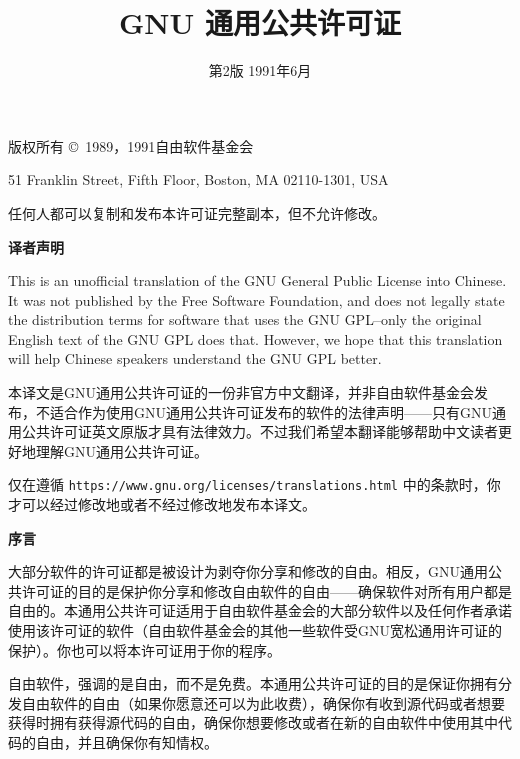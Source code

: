 \documentclass[11pt]{article}
\title{GNU 通用公共许可证}
\date{第2版 \space 1991年6月}
\begin{document}
\maketitle

\begin{center}
{\parindent 0in

版权所有 \copyright\ 1989，1991自由软件基金会

\bigskip

51 Franklin Street, Fifth Floor, Boston, MA  02110-1301, USA

\bigskip

任何人都可以复制和发布本许可证完整副本，但不允许修改。
}
\end{center}

\begin{center}
  {\bf\large 译者声明}
\end{center}

This is an unofficial translation of the GNU General Public License into Chinese. It was not published by the Free Software Foundation, and does not legally state the distribution terms for software that uses the GNU GPL--only the original English text of the GNU GPL does that. However, we hope that this translation will help Chinese speakers understand the GNU GPL better.

本译文是GNU通用公共许可证的一份非官方中文翻译，并非自由软件基金会发布，不适合作为使用GNU通用公共许可证发布的软件的法律声明——只有GNU通用公共许可证英文原版才具有法律效力。不过我们希望本翻译能够帮助中文读者更好地理解GNU通用公共许可证。

仅在遵循 \texttt{https://www.gnu.org/licenses/translations.html} 中的条款时，你才可以经过修改地或者不经过修改地发布本译文。

\pagebreak

\begin{center}
{\bf\large 序言}
\end{center}

大部分软件的许可证都是被设计为剥夺你分享和修改的自由。相反，GNU通用公共许可证的目的是保护你分享和修改自由软件的自由——确保软件对所有用户都是自由的。本通用公共许可证适用于自由软件基金会的大部分软件以及任何作者承诺使用该许可证的软件（自由软件基金会的其他一些软件受GNU宽松通用许可证的保护）。你也可以将本许可证用于你的程序。

自由软件，强调的是自由，而不是免费。本通用公共许可证的目的是保证你拥有分发自由软件的自由（如果你愿意还可以为此收费），确保你有收到源代码或者想要获得时拥有获得源代码的自由，确保你想要修改或者在新的自由软件中使用其中代码的自由，并且确保你有知情权。
\end{document}
